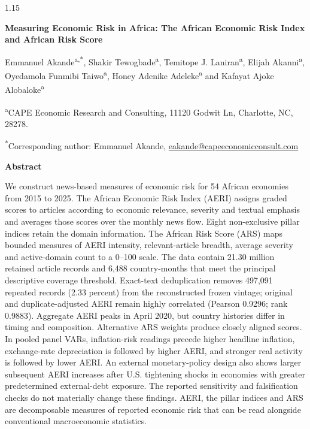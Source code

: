 \documentclass[12pt]{article}
\begin{document}
\thispagestyle{plain}
\begin{center}
\begin{spacing}{1.15}
{\Large\bfseries Measuring Economic Risk in Africa: The African Economic Risk Index and African Risk Score\par}
\medskip
Emmanuel Akande\textsuperscript{a,*}, Shakir Tewogbade\textsuperscript{a}, Temitope J. Laniran\textsuperscript{a}, Elijah Akanni\textsuperscript{a}, Oyedamola Funmibi Taiwo\textsuperscript{a}, Honey Adenike Adeleke\textsuperscript{a} and Kafayat Ajoke Alobaloke\textsuperscript{a}\par
{\small\textsuperscript{a}CAPE Economic Research and Consulting, 11120 Godwit Ln, Charlotte, NC, 28278.\par
\textsuperscript{*}Corresponding author: Emmanuel Akande, \href{mailto:eakande@capeeconomicconsult.com}{eakande@capeeconomicconsult.com}\par}
\end{spacing}
\end{center}
\begin{center}\textbf{Abstract}\end{center}\vspace{-6pt}
\noindent We construct news-based measures of economic risk for 54 African economies from 2015 to 2025. The African Economic Risk Index (AERI) assigns graded scores to articles according to economic relevance, severity and textual emphasis and averages those scores over the monthly news flow. Eight non-exclusive pillar indices retain the domain information. The African Risk Score (ARS) maps bounded measures of AERI intensity, relevant-article breadth, average severity and active-domain count to a 0--100 scale. The data contain 21.30 million retained article records and 6,488 country-months that meet the principal descriptive coverage threshold. Exact-text deduplication removes 497,091 repeated records (2.33 percent) from the reconstructed frozen vintage; original and duplicate-adjusted AERI remain highly correlated (Pearson 0.9296; rank 0.9883). Aggregate AERI peaks in April 2020, but country histories differ in timing and composition. Alternative ARS weights produce closely aligned scores. In pooled panel VARs, inflation-risk readings precede higher headline inflation, exchange-rate depreciation is followed by higher AERI, and stronger real activity is followed by lower AERI. An external monetary-policy design also shows larger subsequent AERI increases after U.S. tightening shocks in economies with greater predetermined external-debt exposure. The reported sensitivity and falsification checks do not materially change these findings. AERI, the pillar indices and ARS are decomposable measures of reported economic risk that can be read alongside conventional macroeconomic statistics.
\end{document}
